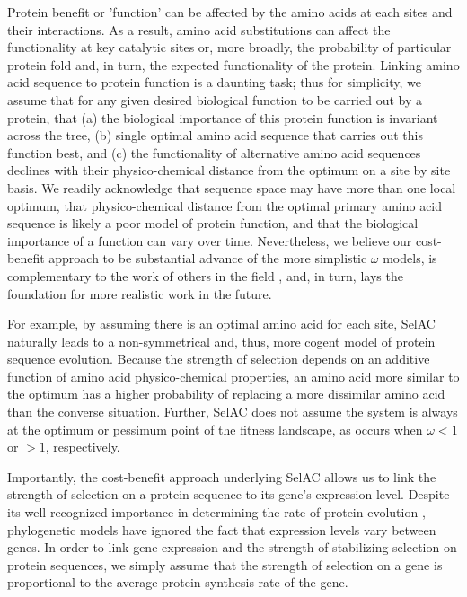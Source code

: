 \documentclass[12pt,letterpaper]{article}
\newcommand{\PC}{physico-chemical\xspace}
\newcommand{\selac}{SelAC\xspace}
\begin{document}
Protein benefit or 'function' can be affected by the amino acids at each sites and their interactions.
As a result, amino acid substitutions can affect the functionality at key catalytic sites or, more broadly, the probability of particular protein fold and, in turn, the expected functionality of the protein.
Linking amino acid sequence to protein function is a daunting task; thus for simplicity, we assume that for any given desired biological function to be carried out by a protein, that (a) the biological importance of this protein function is invariant across the tree, (b) single optimal amino acid sequence that carries out this function best, and (c) the functionality of alternative amino acid sequences declines with their \PC distance from the optimum on a site by site basis.
We readily acknowledge that sequence space may have more than one local optimum, that \PC distance from the optimal primary amino acid sequence is likely a poor model of protein function, and that the biological importance of a function can vary over time.
Nevertheless, we believe our cost-benefit approach to be substantial advance of the more simplistic $\omega$ models, is complementary to the work of others in the field \citep[e.g.][]{ThorneEtAl2012,RodrigueAndLartillot2014},  and, in turn, lays the foundation for more realistic work in the future.

For example, by assuming there is an optimal amino acid for each site, \selac naturally leads to a non-symmetrical and, thus, more cogent model of protein sequence evolution.
Because the strength of selection depends on an additive function of amino acid \PC properties, an amino acid more similar to the optimum has a higher probability of replacing a more dissimilar amino acid than the converse situation.
Further, \selac does not assume the system is always at the optimum or pessimum point of the fitness landscape, as occurs when $\omega < 1$ or $>1$, respectively.

Importantly, the cost-benefit approach underlying \selac allows us to link the strength of selection on a protein sequence to its gene's expression level.
Despite its well recognized importance in determining the rate of protein evolution \citep[e.g.][]{DrummondEtAl2005,DrummondEtAl2006a}, phylogenetic models have ignored the fact that expression levels vary between genes.
In order to link gene expression and the strength of stabilizing selection on protein sequences, we simply assume that the strength of selection on a gene is proportional to the average protein synthesis rate of the gene.
\end{document}
